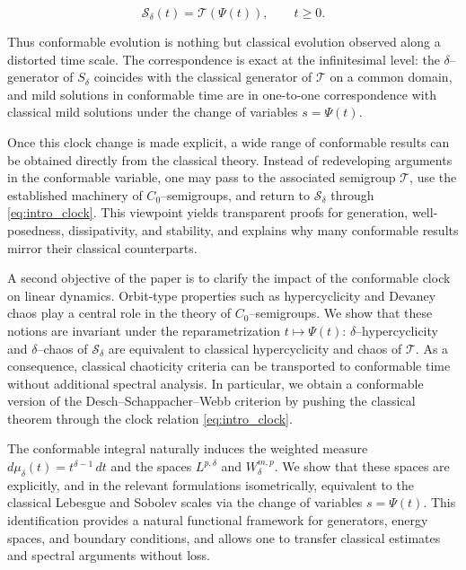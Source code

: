 \documentclass[preprint,12pt]{elsarticle}
\begin{document}
\begin{equation}\label{eq:intro_clock}
\mathcal S_\delta(t)=\mathcal T(\Psi(t)),\qquad t\ge0.
\end{equation}

Thus conformable evolution is nothing but classical evolution observed along a distorted time scale. The correspondence is exact at the infinitesimal level: the $\delta$--generator of $S_\delta$ coincides with the classical generator of $\mathcal T$ on a common domain, and mild solutions in conformable time are in one-to-one correspondence with classical mild solutions under the change of variables $s=\Psi(t)$.

Once this clock change is made explicit, a wide range of conformable results can be obtained directly from the classical theory. Instead of redeveloping arguments in the conformable variable, one may pass to the associated semigroup $\mathcal T$, use the established machinery of $C_0$--semigroups, and return to $\mathcal S_\delta$ through \eqref{eq:intro_clock}. This viewpoint yields transparent proofs for generation, well-posedness, dissipativity, and stability, and explains why many conformable results mirror their classical counterparts.

A second objective of the paper is to clarify the impact of the conformable clock on linear dynamics. Orbit-type properties such as hypercyclicity and Devaney chaos play a central role in the theory of $C_0$--semigroups. We show that these notions are invariant under the reparametrization $t\mapsto\Psi(t)$: $\delta$--hypercyclicity and $\delta$--chaos of $\mathcal S_\delta$ are equivalent to classical hypercyclicity and chaos of $\mathcal T$.
As a consequence, classical chaoticity criteria can be transported to conformable time without additional spectral analysis. In particular, we obtain a conformable version of the Desch--Schappacher--Webb criterion by pushing the classical theorem through the clock relation \eqref{eq:intro_clock}.

The conformable integral naturally induces the weighted measure $d\mu_\delta(t)=t^{\delta-1}\,dt$ and the spaces $L^{p,\delta}$ and $W^{m,p}_\delta$. We show that these spaces are explicitly, and in the relevant formulations isometrically, equivalent to the classical Lebesgue and Sobolev scales via the change of variables $s=\Psi(t)$. This identification provides a natural functional framework for generators, energy spaces, and boundary conditions, and allows one to transfer classical estimates and spectral arguments without loss.
\end{document}
